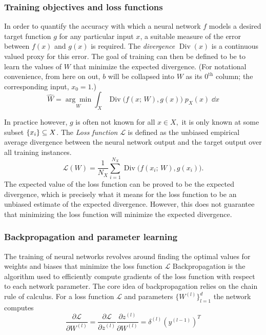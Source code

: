         \subsubsection{Training objectives and loss functions}
            In order to quantify the accuracy with which a neural network \(f\) models a desired target function \(g\) for any particular input \(x\), a suitable measure of the error between \(f(x)\) and \(g(x)\) is required.
            The \emph{divergence} \(\operatorname{Div}(x)\) is a continuous valued proxy for this error.
            The goal of training can then be defined to be to learn the values of \(W\) that minimize the expected divergence.
            (For notational convenience, from here on out, \(b\) will be collapsed into \(W\) as its \(0^{\textrm{th}}\) column;
            the corresponding input, \(x_0 = 1\).)
            \begin{equation}
                \widehat{W} = \underset{W}{\arg\min}\int_X \operatorname{Div}\Big(f(x;\,W), g(x)\Big)\;p_X(x)\;\dd x
            \end{equation}

            In practice however, \(g\) is often not known for all \(x\in X,\) it is only known at some subset \(\qty{x_i}\subseteq X\).
            The \emph{Loss function} \(\mathcal{L}\) is defined as the unbiased empirical average divergence between the neural network output and the target output over all training instances.
            \begin{equation}
                \mathcal{L}(W) = \frac{1}{N_X}\sum_{i=1}^{N_X}\operatorname{Div}\Big(f(x_i;\,W), g(x_i)\Big).
            \end{equation}
            The expected value of the loss function can be proved to be the expected divergence, which is precisely what it means for the loss function to be an unbiased estimate of the expected divergence.
            However, this does not guarantee that minimizing the loss function will minimize the expected divergence.
        \subsubsection{Backpropagation and parameter learning}
            The training of neural networks revolves around finding the optimal values for weights and biases that minimize the loss function \(\mathcal{L}\)
            Backpropagation is the algorithm used to efficiently compute gradients of the loss function with respect to each network parameter.
            The core idea of backpropagation relies on the chain rule of calculus.
            For a loss function \(\mathcal{L}\) and parameters \(\{W^{(l)}\}_{l=1}^d\) the network computes
            \begin{equation}
            \frac{\partial \mathcal{L}}{\partial W^{(l)}} = \frac{\partial \mathcal{L}}{\partial z^{(l)}} \frac{\partial z^{(l)}}{\partial W^{(l)}} = \delta^{(l)} (y^{(l-1)})^T 
            \end{equation}
            
